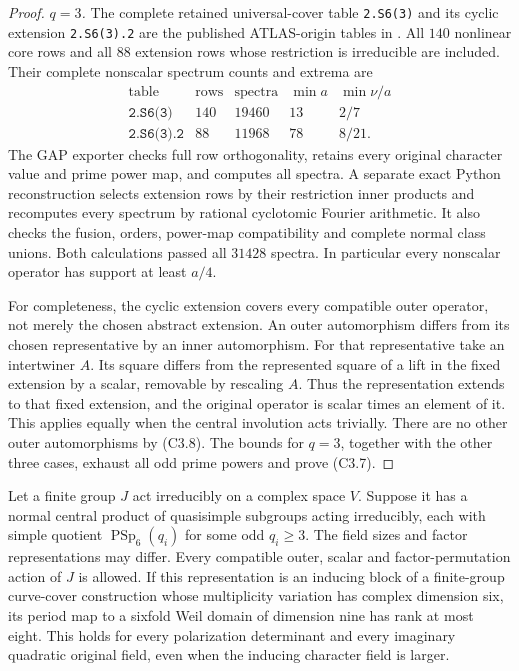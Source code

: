 \begin{proof}
\emph{$q=3$.}
The complete retained universal-cover table
\texttt{2.S6(3)} and its cyclic extension
\texttt{2.S6(3).2} are the published ATLAS-origin tables in
\cite{C3:Small}. All $140$ nonlinear core rows and all $88$
extension rows whose restriction is irreducible are included.
Their complete nonscalar spectrum counts and extrema are
\[
\begin{array}{c|r|r|r|c}
 \text{table}&\text{rows}&\text{spectra}&\min a&\min\nu/a\\\hline
 \texttt{2.S6(3)}&140&19460&13&2/7\\
 \texttt{2.S6(3).2}&88&11968&78&8/21.
\end{array}                                                     \tag{C3.18}
\]
The GAP exporter checks full row orthogonality, retains every
original character value and prime power map, and computes all
spectra. A separate exact Python reconstruction selects extension
rows by their restriction inner products and recomputes every
spectrum by rational cyclotomic Fourier arithmetic. It also
checks the fusion, orders, power-map compatibility and complete
normal class unions. Both calculations passed all $31428$
spectra. In particular every nonscalar operator has support at
least $a/4$.

For completeness, the cyclic extension covers every compatible
outer operator, not merely the chosen abstract extension.
An outer automorphism differs from its chosen representative
by an inner automorphism. For that representative take an
intertwiner $A$. Its square differs from the represented
square of a lift in the fixed extension by a scalar, removable
by rescaling $A$. Thus the representation extends to that
fixed extension, and the original operator is scalar times an
element of it. This applies equally when the central involution
acts trivially. There are no other outer automorphisms by
(C3.8). The bounds for $q=3$, together with the other three
cases, exhaust all odd prime powers and prove (C3.7).
\end{proof}

\begin{theorem}
\label{D-C3-03}
Let a finite group $J$ act irreducibly on a complex space $V$.
Suppose it has a normal central product of quasisimple subgroups
acting irreducibly, each with simple quotient
$\operatorname{PSp}_6(q_i)$ for some odd $q_i\ge3$.
The field sizes and factor representations may differ. Every
compatible outer, scalar and factor-permutation action of $J$
is allowed. If this representation is an inducing block of a
finite-group curve-cover construction whose multiplicity
variation has complex dimension six, its period map to a
sixfold Weil domain of dimension nine has rank at most eight.
This holds for every polarization determinant and every
imaginary quadratic original field, even when the inducing
character field is larger.
\end{theorem}

